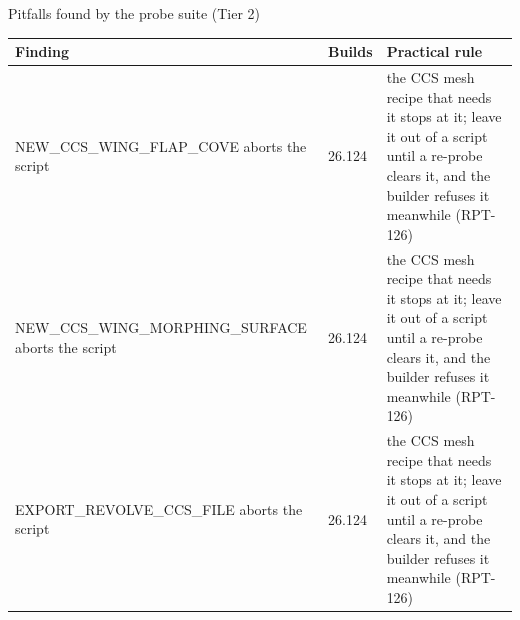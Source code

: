 \documentclass[aspectratio=169,10pt]{beamer}
\begin{document}
\begin{frame}[allowframebreaks]{Pitfalls found by the probe suite (Tier 2)}
  \begin{tabular}{@{}p{6.0cm}p{1.6cm}p{6.5cm}@{}}
    \toprule
    Finding & Builds & Practical rule \\
    \midrule
    NEW\_CCS\_WING\_FLAP\_COVE aborts the script & 26.124 & the CCS mesh recipe that needs it stops at it; leave it out of a script until a re-probe clears it, and the builder refuses it meanwhile (RPT-126) \\
    NEW\_CCS\_WING\_MORPHING\_SURFACE aborts the script & 26.124 & the CCS mesh recipe that needs it stops at it; leave it out of a script until a re-probe clears it, and the builder refuses it meanwhile (RPT-126) \\
    EXPORT\_REVOLVE\_CCS\_FILE aborts the script & 26.124 & the CCS mesh recipe that needs it stops at it; leave it out of a script until a re-probe clears it, and the builder refuses it meanwhile (RPT-126) \\
    \bottomrule
  \end{tabular}


\end{frame}
\end{document}
